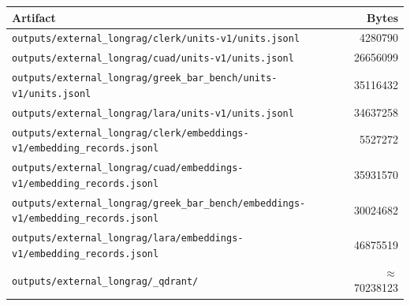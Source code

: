 \documentclass[11pt,a4paper]{article}
\begin{document}
\begin{center}
\small
\begin{tabular}{l r}
\toprule
\textbf{Artifact} & \textbf{Bytes} \\
\midrule
\texttt{outputs/external\_longrag/clerk/units-v1/units.jsonl}             & \num{4280790} \\
\texttt{outputs/external\_longrag/cuad/units-v1/units.jsonl}              & \num{26656099} \\
\texttt{outputs/external\_longrag/greek\_bar\_bench/units-v1/units.jsonl} & \num{35116432} \\
\texttt{outputs/external\_longrag/lara/units-v1/units.jsonl}              & \num{34637258} \\
\texttt{outputs/external\_longrag/clerk/embeddings-v1/embedding\_records.jsonl}             & \num{5527272} \\
\texttt{outputs/external\_longrag/cuad/embeddings-v1/embedding\_records.jsonl}              & \num{35931570} \\
\texttt{outputs/external\_longrag/greek\_bar\_bench/embeddings-v1/embedding\_records.jsonl} & \num{30024682} \\
\texttt{outputs/external\_longrag/lara/embeddings-v1/embedding\_records.jsonl}              & \num{46875519} \\
\texttt{outputs/external\_longrag/\_qdrant/}                                & $\approx$ \num{70238123} \\
\bottomrule
\end{tabular}
\end{center}
\end{document}
